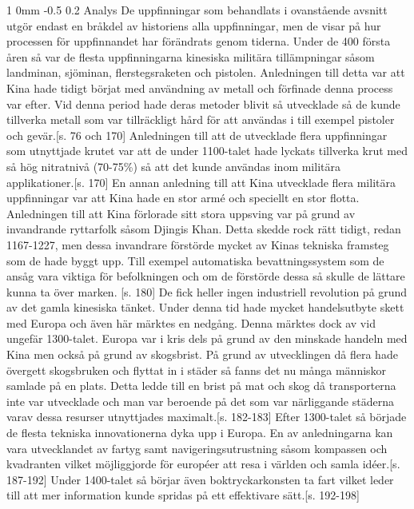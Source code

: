 \documentclass[a4paper,12pt]{article}
\makeatletter
\renewcommand{\section}{\@startsection
   {section}%
   {1}%
   {0mm}%
   {-0.5\baselineskip}%
   {0.2\baselineskip}%
   {\sffamily\bfseries\upshape\normalsize}}%
\makeatother
\begin{document}
\section{Analys}
De uppfinningar som behandlats i ovanstående avsnitt utgör endast en bråkdel av historiens alla uppfinningar, men de visar på hur processen för uppfinnandet har förändrats genom tiderna. Under de 400 första åren så var de flesta uppfinningarna kinesiska militära tillämpningar såsom landminan, sjöminan, flerstegsraketen och pistolen. Anledningen till detta var att Kina hade tidigt börjat med användning av metall och förfinade denna process var efter. Vid denna period hade deras metoder blivit så utvecklade så de kunde tillverka metall som var tillräckligt hård för att användas i till exempel pistoler och gevär.\cite{hansson}[s. 76 och 170] Anledningen till att de utvecklade flera uppfinningar som utnyttjade krutet var att de under 1100-talet hade lyckats tillverka krut med så hög nitratnivå (70-75\%) så att det kunde användas inom militära applikationer.\cite{hansson}[s. 170] En annan anledning till att Kina utvecklade flera militära uppfinningar var att Kina hade en stor armé och speciellt en stor flotta.
\newline
\newline
Anledningen till att Kina förlorade sitt stora uppsving var på grund av invandrande ryttarfolk såsom Djingis Khan. Detta skedde rock rätt tidigt, redan 1167-1227, men dessa invandrare förstörde mycket av Kinas tekniska framsteg som de hade byggt upp. Till exempel automatiska bevattningssystem som de ansåg vara viktiga för befolkningen och om de förstörde dessa så skulle de lättare kunna ta över marken. \cite{hansson}[s. 180] De fick heller ingen industriell revolution på grund av det gamla kinesiska tänket.
\newline
\newline
Under denna tid hade mycket handelsutbyte skett med Europa och även här märktes en nedgång. Denna märktes dock av vid ungefär 1300-talet. Europa var i kris dels på grund av den minskade handeln med Kina men också på grund av skogsbrist. På grund av utvecklingen då flera hade övergett skogsbruken och flyttat in i städer så fanns det nu många människor samlade på en plats. Detta ledde till en brist på mat och skog då transporterna inte var utvecklade och man var beroende på det som var närliggande städerna varav dessa resurser utnyttjades maximalt.\cite{hansson}[s. 182-183]
\newline
\newline
Efter 1300-talet så började de flesta tekniska innovationerna dyka upp i Europa. En av anledningarna kan vara utvecklandet av fartyg samt navigeringsutrustning såsom kompassen och kvadranten vilket möjliggjorde för européer att resa i världen och samla idéer.\cite{hansson}[s. 187-192] Under 1400-talet så börjar även boktryckarkonsten ta fart vilket leder till att mer information kunde spridas på ett effektivare sätt.\cite{hansson}[s. 192-198]
\end{document}
